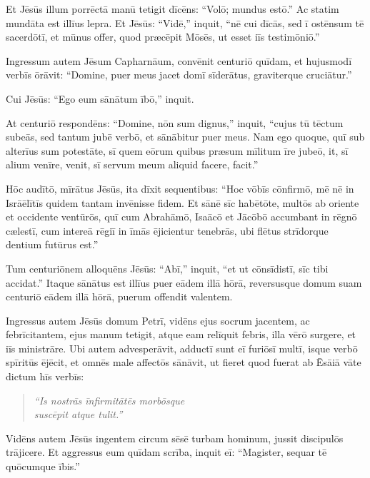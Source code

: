 \Versus Et Jēsūs illum porrēctā manū tetigit dīcēns: ``Volō; mundus estō.'' Ac statim mundāta est illīus lepra. 
\Versus Et Jēsūs: ``Vidē,'' inquit, ``nē cui dīcās, sed ī ostēnsum tē sacerdōtī, et mūnus offer, quod præcēpit Mōsēs, ut esset iīs testimōniō.''

\Versus Ingressum autem Jēsum Capharnāum, convēnit centuriō quīdam, et hujusmodī verbīs ōrāvit: 
\Versus ``Domine, puer meus jacet domī sīderātus, graviterque cruciātur.'' 

\Versus Cui Jēsūs: ``Ego eum sānātum ībō,'' inquit.

\Versus At centuriō respondēns: ``Domine, nōn sum dignus,'' inquit, ``cujus tū tēctum subeās, sed tantum jubē verbō, et sānābitur puer meus. 
\Versus Nam ego quoque, quī sub alterīus sum potestāte, sī quem eōrum quibus præsum mīlitum īre jubeō, it, sī alium venīre, venit, sī servum meum aliquid facere, facit.'' 

\Versus Hōc audītō, mīrātus Jēsūs, ita dīxit sequentibus: ``Hoc vōbīs cōnfirmō, mē nē in Isrāēlītīs quidem tantam invēnisse fidem. 
\Versus Et sānē sīc habētōte, multōs ab oriente et occidente ventūrōs, quī cum Abrahāmō, Isaācō et Jācōbō accumbant in rēgnō cælestī, 
\Versus cum intereā rēgiī in īmās ējicientur tenebrās, ubi flētus strīdorque dentium futūrus est.'' 

\Versus Tum centuriōnem alloquēns Jēsūs: ``Abī,'' inquit, ``et ut cōnsīdistī, sīc tibi accidat.'' Itaque sānātus est illīus puer eādem illā hōrā, reversusque domum suam centuriō eādem illā hōrā, puerum offendit valentem.

\Versus Ingressus autem Jēsūs domum Petrī, vidēns ejus socrum jacentem, ac febrīcitantem, 
\Versus ejus manum tetigit, atque eam relīquit febris, illa vērō surgere, et iīs ministrāre. 
\Versus Ubi autem advesperāvit, adductī sunt eī furiōsī multī, isque verbō spīritūs ējēcit, et omnēs male affectōs sānāvit, 
\Versus ut fieret quod fuerat ab Ēsāiā vāte dictum hīs verbīs:
\begin{verse}
\begin{patverse*}
\emph{``Is nostrās īnfirmitātēs morbōsque\\
suscēpit atque tulit.''}
\end{patverse*}
\end{verse}

\Versus Vidēns autem Jēsūs ingentem circum sēsē turbam hominum, jussit discipulōs trājicere. 
\Versus Et aggressus eum quīdam scrība, inquit eī: ``Magister, sequar tē quōcumque ībis.'' 

